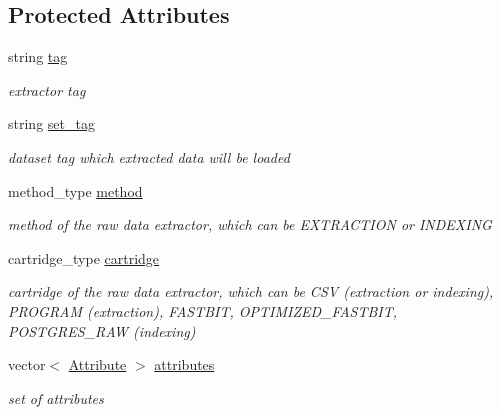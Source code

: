 \subsection*{Protected Attributes}
\begin{DoxyCompactItemize}
\item 
\mbox{\label{classExtractor_a53f998b8d2fb1032f6c86f0d04a2ffc8}} 
string \hyperlink{classExtractor_a53f998b8d2fb1032f6c86f0d04a2ffc8}{tag}
\begin{DoxyCompactList}\small\item\em extractor tag \end{DoxyCompactList}\item 
\mbox{\label{classExtractor_acafbe087b3bae5259d6e6c7bb7999255}} 
string \hyperlink{classExtractor_acafbe087b3bae5259d6e6c7bb7999255}{set\+\_\+tag}
\begin{DoxyCompactList}\small\item\em dataset tag which extracted data will be loaded \end{DoxyCompactList}\item 
\mbox{\label{classExtractor_a9167bf123b2164a89175253d64bdab43}} 
method\+\_\+type \hyperlink{classExtractor_a9167bf123b2164a89175253d64bdab43}{method}
\begin{DoxyCompactList}\small\item\em method of the raw data extractor, which can be E\+X\+T\+R\+A\+C\+T\+I\+ON or I\+N\+D\+E\+X\+I\+NG \end{DoxyCompactList}\item 
\mbox{\label{classExtractor_a19cea477abf042cec1ad70cb56bbd973}} 
cartridge\+\_\+type \hyperlink{classExtractor_a19cea477abf042cec1ad70cb56bbd973}{cartridge}
\begin{DoxyCompactList}\small\item\em cartridge of the raw data extractor, which can be C\+SV (extraction or indexing), P\+R\+O\+G\+R\+AM (extraction), F\+A\+S\+T\+B\+IT, O\+P\+T\+I\+M\+I\+Z\+E\+D\+\_\+\+F\+A\+S\+T\+B\+IT, P\+O\+S\+T\+G\+R\+E\+S\+\_\+\+R\+AW (indexing) \end{DoxyCompactList}\item 
\mbox{\label{classExtractor_a16cd88e5932d56a8628af94df5af9cc4}} 
vector$<$ \hyperlink{classAttribute}{Attribute} $>$ \hyperlink{classExtractor_a16cd88e5932d56a8628af94df5af9cc4}{attributes}
\begin{DoxyCompactList}\small\item\em set of attributes \end{DoxyCompactList}\end{DoxyCompactItemize}


